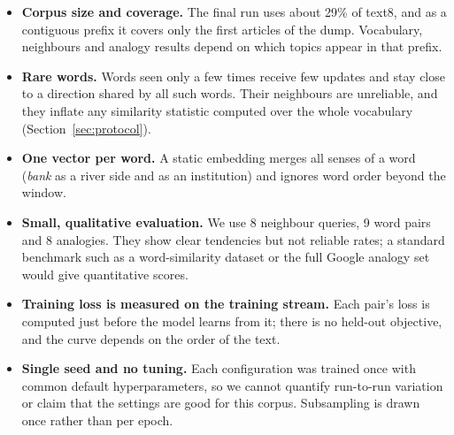 \begin{itemize}
    \item \textbf{Corpus size and coverage.} The final run uses about 29\% of text8, and as a contiguous prefix it covers only the first articles of the dump. Vocabulary, neighbours and analogy results depend on which topics appear in that prefix.
    \item \textbf{Rare words.} Words seen only a few times receive few updates and stay close to a direction shared by all such words. Their neighbours are unreliable, and they inflate any similarity statistic computed over the whole vocabulary (Section~\ref{sec:protocol}).
    \item \textbf{One vector per word.} A static embedding merges all senses of a word (\textit{bank} as a river side and as an institution) and ignores word order beyond the window.
    \item \textbf{Small, qualitative evaluation.} We use 8 neighbour queries, 9 word pairs and 8 analogies. They show clear tendencies but not reliable rates; a standard benchmark such as a word-similarity dataset or the full Google analogy set would give quantitative scores.
    \item \textbf{Training loss is measured on the training stream.} Each pair's loss is computed just before the model learns from it; there is no held-out objective, and the curve depends on the order of the text.
    \item \textbf{Single seed and no tuning.} Each configuration was trained once with common default hyperparameters, so we cannot quantify run-to-run variation or claim that the settings are good for this corpus. Subsampling is drawn once rather than per epoch.
\end{itemize}
